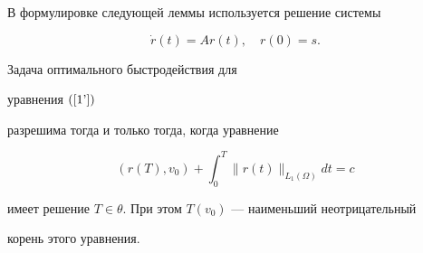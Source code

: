 В формулировке следующей леммы используется решение системы


\begin{equation}  \label{sys}


\Dot r(t)=Ar(t),\quad r(0)=s.


\end{equation}





\begin{lem}


Задача оптимального быстродействия для 


уравнения $(\ref{1'})$


разрешима тогда и только тогда, когда уравнение


\begin{equation}  \label{e1}


(r(T),v_0)+\int_0^T\|r(t) \|_{L_1(\Omega)}  dt=c


\end{equation}


имеет решение $T\in\theta$. При этом $T(v_0)$ --- наименьший неотрицательный


корень этого уравнения.


\end{lem}






